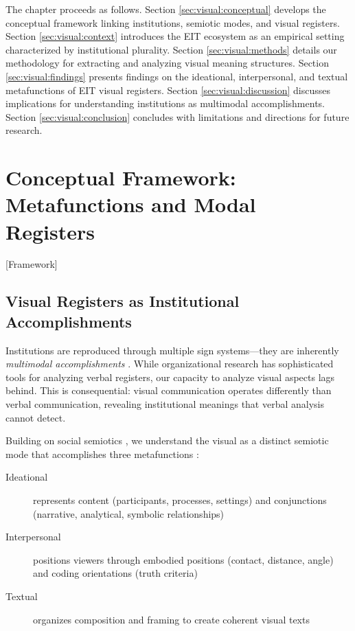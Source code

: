 \documentclass[../main.tex]{subfiles}
\begin{document}
The chapter proceeds as follows. Section \ref{sec:visual:conceptual} develops the conceptual framework linking institutions, semiotic modes, and visual registers. Section \ref{sec:visual:context} introduces the EIT ecosystem as an empirical setting characterized by institutional plurality. Section \ref{sec:visual:methods} details our methodology for extracting and analyzing visual meaning structures. Section \ref{sec:visual:findings} presents findings on the ideational, interpersonal, and textual metafunctions of EIT visual registers. Section \ref{sec:visual:discussion} discusses implications for understanding institutions as multimodal accomplishments. Section \ref{sec:visual:conclusion} concludes with limitations and directions for future research.

\section{Conceptual Framework: Metafunctions and Modal Registers}[Framework]

\subsection{Visual Registers as Institutional Accomplishments}

Institutions are reproduced through multiple sign systems---they are inherently \textit{multimodal accomplishments} \cite{jancsary2018institutions}. While organizational research has sophisticated tools for analyzing verbal registers, our capacity to analyze visual aspects lags behind. This is consequential: visual communication operates differently than verbal communication, revealing institutional meanings that verbal analysis cannot detect.

Building on social semiotics \cite{kress2006reading}, we understand the visual as a distinct semiotic mode that accomplishes three metafunctions \cite{halliday1978language}:

\begin{description}
    \item[Ideational] represents content (participants, processes, settings) and conjunctions (narrative, analytical, symbolic relationships)
    \item[Interpersonal] positions viewers through embodied positions (contact, distance, angle) and coding orientations (truth criteria)
    \item[Textual] organizes composition and framing to create coherent visual texts
\end{description}
\end{document}
